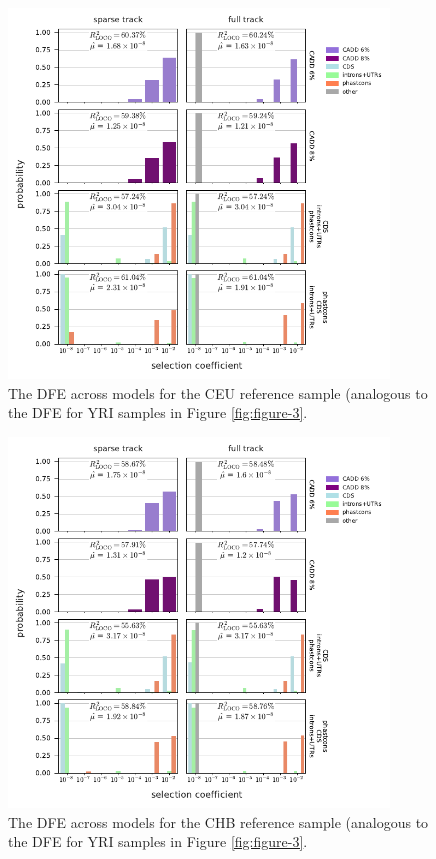 \documentclass[11pt]{article}
\begin{document}
\begin{figure}[htbp]
  \label{suppfig:dfe-ceu}
  \centering
  \includegraphics[width=0.9\textwidth]{figures/supplementary/figure_ceu_dfe.pdf}
  \caption{The DFE across models for the CEU reference sample (analogous to the
  DFE for YRI samples in Figure \ref{fig:figure-3}.}
\end{figure}

\begin{figure}[htbp]
    \label{suppfig:dfe-chb}
  \centering
  \includegraphics[width=0.9\textwidth]{figures/supplementary/figure_chb_dfe.pdf}
  \caption{The DFE across models for the CHB reference sample (analogous to the
  DFE for YRI samples in Figure \ref{fig:figure-3}.}
\end{figure}
\end{document}
